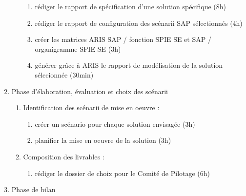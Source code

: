 \begin{enumerate}
\begin{enumerate}
                \begin{enumerate}
                  \item rédiger le rapport de spécification d'une solution spécifique (8h)
                  \item rédiger le rapport de configuration des scénarii SAP sélectionnés (4h)
                  \item créer les matrices ARIS SAP / fonction SPIE SE et SAP / organigramme SPIE SE (3h)
                  \item générer grâce à ARIS le rapport de modélisation de la solution sélecionnée (30min)
                \end{enumerate}
          \end{enumerate}

    \item Phase d'élaboration, évaluation et choix des scénarii

          \begin{enumerate}
            \item Identification des scénarii de mise en oeuvre :
                \begin{enumerate}
                  \item créer un scénario pour chaque solution envisagée (3h)
                  \item planifier la mise en oeuvre de la solution (3h)
                \end{enumerate}
            \item Composition des livrables :
                \begin{enumerate}
                  \item rédiger le dossier de choix pour le Comité de Pilotage (6h)
                \end{enumerate}
          \end{enumerate}

\item Phase de bilan


\end{enumerate}
